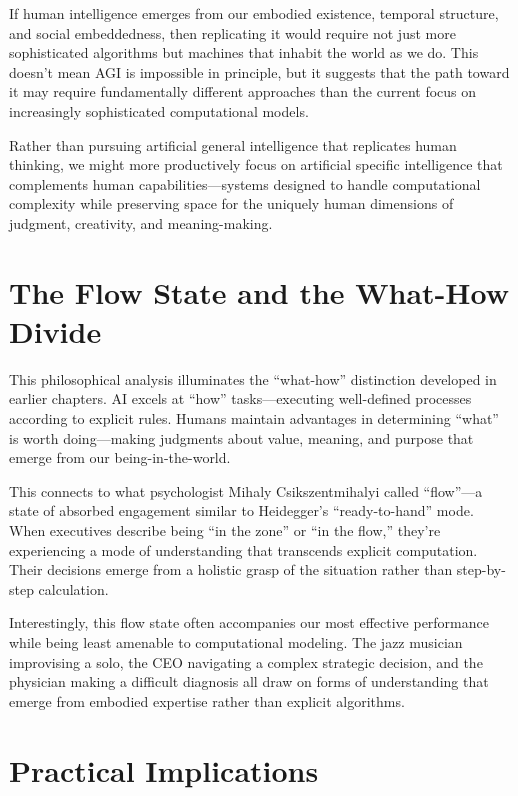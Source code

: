 \documentclass[
  Letterpaper,
]{scrbook}
\begin{document}
If human intelligence emerges from our embodied existence, temporal
structure, and social embeddedness, then replicating it would require
not just more sophisticated algorithms but
machines that inhabit the world as we do. This doesn't mean AGI is
impossible in principle, but it suggests that the path toward it may
require fundamentally different approaches than the current focus on
increasingly sophisticated computational models.

Rather than pursuing artificial general intelligence that replicates
human thinking, we might more productively focus on artificial specific
intelligence that complements human capabilities---systems designed to
handle computational complexity while preserving space for the uniquely
human dimensions of judgment, creativity, and meaning-making.

\section{The Flow State and the What-How
Divide}\label{the-flow-state-and-the-what-how-divide}

This philosophical analysis illuminates the ``what-how'' distinction
developed in earlier chapters. AI excels at ``how'' tasks---executing
well-defined processes according to explicit rules. Humans maintain
advantages in determining ``what'' is worth doing---making judgments
about value, meaning, and purpose that emerge from our
being-in-the-world.

This connects to what psychologist Mihaly Csikszentmihalyi called
``flow''---a state of absorbed engagement similar to Heidegger's
``ready-to-hand'' mode. When executives describe being ``in the zone''
or ``in the flow,'' they're experiencing a mode of understanding that
transcends explicit computation. Their decisions emerge from a holistic
grasp of the situation rather than step-by-step calculation.

Interestingly, this flow state often accompanies our most effective
performance while being least amenable to computational modeling. The
jazz musician improvising a solo, the CEO navigating a complex strategic
decision, and the physician making a difficult diagnosis all draw on
forms of understanding that emerge from embodied expertise rather than
explicit algorithms.

\section{Practical Implications}\label{practical-implications}
\end{document}
